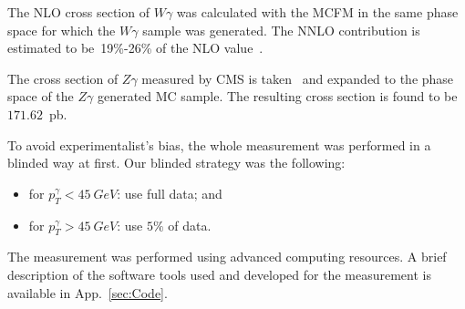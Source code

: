 The NLO cross section of $W\gamma$ was calculated with the MCFM in the same phase space for which the $W\gamma$ sample was generated. The NNLO contribution is estimated to be~19\%-26\% of the NLO value~\cite{ref_theory_NNLO}.

The cross section of $Z\gamma$ measured by CMS is taken~\cite{ref_Zg8TeV} and expanded to the phase space of the $Z\gamma$ generated MC sample. The resulting cross section is found to be~$171.62$~pb.

To avoid experimentalist's bias, the whole measurement was performed in a blinded way at first. Our blinded strategy was the following:
\begin{itemize}
  \item for $p_T^{\gamma}<45~GeV$: use full data; and
  \item for $p_T^{\gamma}>45~GeV$: use $5\%$ of data.
\end{itemize}

The measurement was performed using advanced computing resources. A brief description of the software tools used and developed for the measurement is available in App.~\ref{sec:Code}.

